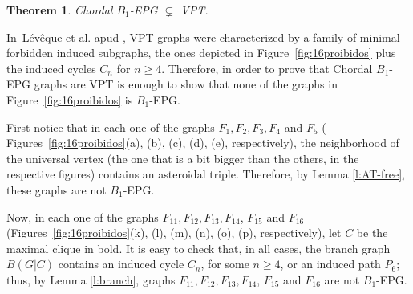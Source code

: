 \documentclass[9pt]{entcs}
\newtheorem{teo}[thm]{Theorem}%
\begin{document}
\begin{teo}\label{teo:chordalB1inVPT}
Chordal $B_1$-EPG $\subsetneq$ VPT. 
\end{teo}

In~L{\'e}v{\^e}que et al. \cite{leveque2009characterizing} apud \cite{alcon2015characterizing},  VPT graphs were characterized by a family of minimal forbidden induced subgraphs,
the ones depicted in 
Figure~\ref{fig:16proibidos} plus the induced cycles $C_n$ for $n\geq 4$. Therefore, in order to prove
that Chordal $B_1$-EPG graphs are VPT is enough to show that none of the graphs in Figure~\ref{fig:16proibidos} 
is $B_1$-EPG. %

First notice that in each one of the graphs $F_{1}, F_{2}, F_{3}, F_{4}$ and $F_{5}$ ( Figures~\ref{fig:16proibidos}(a), (b), (c), (d), (e), respectively), the neighborhood of the universal vertex (the one that is a bit bigger than the others, in the respective figures) contains an asteroidal triple. Therefore, by Lemma \ref{l:AT-free}, these graphs are not  $B_1$-EPG.

Now, in each one of the graphs $F_{11}, F_{12}, F_{13}, F_{14}$, $F_{15}$ and $F_{16}$  (Figures~\ref{fig:16proibidos}(k), (l), (m), (n), (o), (p), respectively), let $C$ be the maximal clique in bold. It is easy to check that, in all cases, the branch graph $B(G|C)$ contains an induced cycle $C_n$, for some $n\geq 4$, or an induced path $P_6$; thus, by Lemma \ref{l:branch},  graphs $F_{11}, F_{12}, F_{13}, F_{14}$, $F_{15}$ and $F_{16}$ are not $B_1$-EPG.




\end{document}

